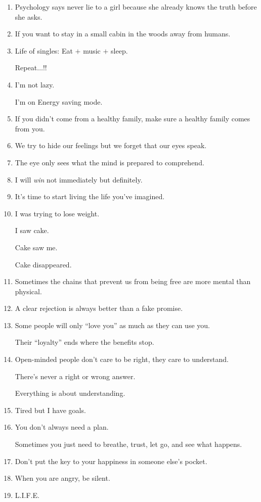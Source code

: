 \documentclass{article}
\numberwithin{equation}{section}
\begin{document}
\begin{enumerate}
    - There isn't a single straight man on earth that cares if you wear the same cute dress twice.
    
    The negative comments will come from other women.
    \item Psychology says never lie to a girl because she already knows the truth before she asks.
    \item If you want to stay in a small cabin in the woods away from humans.
    \item Life of singles: Eat $+$ music $+$ sleep.
    
    Repeat$\ldots$!!
    \item I'm not lazy.
    
    I'm on Energy saving mode.
    \item If you didn't come from a healthy family, make sure a healthy family comes from you.
    \item We try to hide our feelings but we forget that our eyes speak.
    \item The eye only sees what the mind is prepared to comprehend.
    \item I will \textit{win} not immediately but definitely.
    \item It's time to start living the life you've imagined.
    \item I was trying to lose weight.
    
    I saw cake.
    
    Cake saw me.
    
    Cake disappeared.
    \item Sometimes the chains that prevent us from being free are more mental than physical.
    \item A clear rejection is always better than a fake promise.
    \item Some people will only ``love you'' as much as they can use you.
    
    Their ``loyalty'' ends where the benefits stop.
    \item Open-minded people don't care to be right, they care to understand.
    
    There's never a right or wrong answer.
    
    Everything is about understanding.
    \item Tired but I have goals.
    \item You don't always need a plan.
    
    Sometimes you just need to breathe, trust, let go, and see what happens.
    \item Don't put the key to your happiness in someone else's pocket.
    \item When you are angry, be silent.
    \item L.I.F.E.
    

\end{enumerate}
\end{document}
